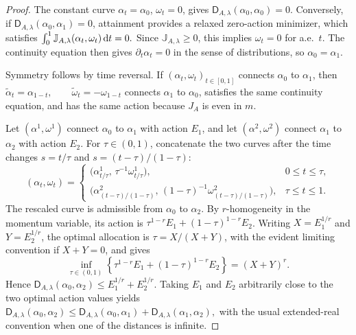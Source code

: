\begin{proof}
The constant curve \(\alpha_t=\alpha_0\), \(\omega_t=0\), gives \(\mathsf D_{A,\lambda}(\alpha_0,\alpha_0)=0\). Conversely, if \(\mathsf D_{A,\lambda}(\alpha_0,\alpha_1)=0\), attainment provides a relaxed zero-action minimizer, which satisfies
\(\int_0^1 \mathbb J_{A,\lambda}(\alpha_t,\omega_t)\,\mathrm{d} t=0.\)
Since \(\mathbb J_{A,\lambda}\geq0\), this implies \(\omega_t=0\) for a.e.\ \(t\). The continuity equation then gives \(\partial_t\alpha_t=0\) in the sense of distributions, so \(\alpha_0=\alpha_1\).

Symmetry follows by time reversal. If \((\alpha_t,\omega_t)_{t\in[0,1]}\) connects \(\alpha_0\) to \(\alpha_1\), then
\(\widetilde\alpha_t=\alpha_{1-t}, \qquad \widetilde\omega_t=-\omega_{1-t}\)
connects \(\alpha_1\) to \(\alpha_0\), satisfies the same continuity equation, and has the same action because \(J_A\) is even in \(m\).

Let \((\alpha^1,\omega^1)\) connect \(\alpha_0\) to \(\alpha_1\) with action \(E_1\), and let \((\alpha^2,\omega^2)\) connect \(\alpha_1\) to \(\alpha_2\) with action \(E_2\). For \(\tau\in(0,1)\), concatenate the two curves after the time changes \(s=t/\tau\) and \(s=(t-\tau)/(1-\tau)\):
\[
(\alpha_t,\omega_t)=
\begin{cases}
\bigl(\alpha^1_{t/\tau},\,\tau^{-1}\omega^1_{t/\tau}\bigr), & 0\leq t\leq \tau,\\[.2em]
\bigl(\alpha^2_{(t-\tau)/(1-\tau)},\,(1-\tau)^{-1}\omega^2_{(t-\tau)/(1-\tau)}\bigr), & \tau\leq t\leq1.
\end{cases}
\]
The rescaled curve is admissible from \(\alpha_0\) to \(\alpha_2\). By \(r\)-homogeneity in the momentum variable, its action is
\(\tau^{1-r}E_1+(1-\tau)^{1-r}E_2\).
Writing \(X=E_1^{1/r}\) and \(Y=E_2^{1/r}\), the optimal allocation is \(\tau=X/(X+Y)\), with the evident limiting convention if \(X+Y=0\), and gives
\[
\inf_{\tau\in(0,1)}
\left\{\tau^{1-r}E_1+(1-\tau)^{1-r}E_2\right\}
=
(X+Y)^r.
\]
Hence \(\mathsf D_{A,\lambda}(\alpha_0,\alpha_2)\leq E_1^{1/r}+E_2^{1/r}\). Taking \(E_1\) and \(E_2\) arbitrarily close to the two optimal action values yields
\(\mathsf D_{A,\lambda}(\alpha_0,\alpha_2) \leq \mathsf D_{A,\lambda}(\alpha_0,\alpha_1)+\mathsf D_{A,\lambda}(\alpha_1,\alpha_2),\)
with the usual extended-real convention when one of the distances is infinite.
\end{proof}
